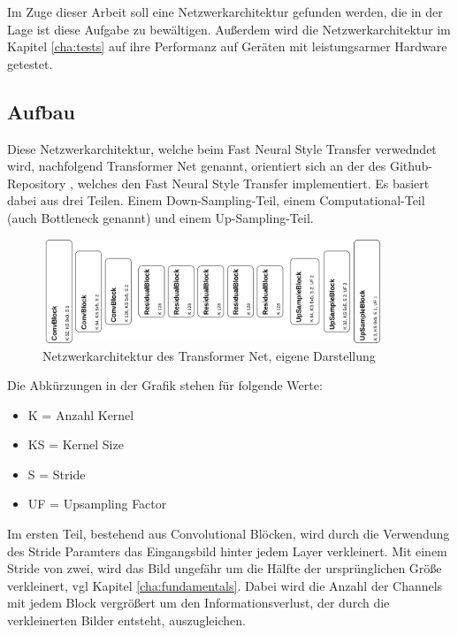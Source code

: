 Im Zuge dieser Arbeit soll eine Netzwerkarchitektur gefunden werden, die in der Lage ist diese Aufgabe zu bewältigen. Außerdem wird die Netzwerkarchitektur im Kapitel \ref{cha:tests} auf ihre Performanz auf Geräten mit leistungsarmer Hardware getestet.

\subsection{Aufbau}
\label{sec:aufbau}

Diese Netzwerkarchitektur, welche beim Fast Neural Style Transfer verwedndet wird, nachfolgend Transformer Net genannt, orientiert sich an der des Github-Repository \cite{PyTorchFastNeuralStyle}, welches den Fast Neural Style Transfer implementiert.
Es basiert dabei aus drei Teilen. Einem Down-Sampling-Teil, einem Computational-Teil (auch Bottleneck genannt) und einem Up-Sampling-Teil.

\begin{figure}[H]
	\centering
	\includegraphics[width=0.90\textwidth]{resources/content/transformer_net.png}
	\caption{Netzwerkarchitektur des Transformer Net, eigene Darstellung}
	\label{img:transformer_net_img}
\end{figure}

Die Abkürzungen in der Grafik stehen für folgende Werte:

\begin{itemize}
	\item K = Anzahl Kernel
	\item KS = Kernel Size
	\item S = Stride
	\item UF = Upsampling Factor
\end{itemize}

Im ersten Teil, bestehend aus Convolutional Blöcken, wird durch die Verwendung des Stride Paramters das Eingangsbild hinter jedem Layer verkleinert.
Mit einem Stride von zwei, wird das Bild ungefähr um die Hälfte der ursprünglichen Größe verkleinert, vgl Kapitel \ref{cha:fundamentals}. Dabei wird die Anzahl der Channels mit jedem Block vergrößert um den Informationsverlust, der durch die verkleinerten Bilder entsteht, auszugleichen.

